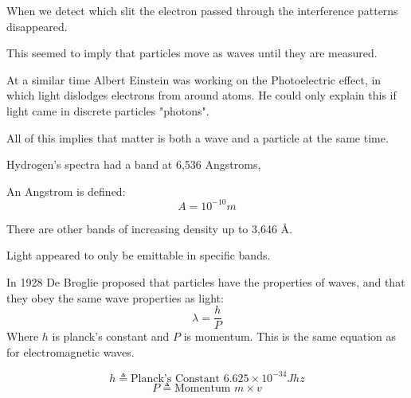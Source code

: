 \documentclass{report}
\begin{document}
\begin{description}
\begin{mdframed}
            When we detect which slit the electron passed
            through the interference patterns disappeared.

            This seemed to imply that particles move as
            waves until they are measured.
        \end{mdframed}
        \begin{mdframed}
            At a similar time Albert Einstein was working on
            the Photoelectric effect, in which light dislodges
            electrons from around atoms. He could only explain
            this if light came in discrete particles "photons".

            All of this implies that matter is both a wave
            and a particle at the same time.
        \end{mdframed}
        \begin{mdframed}
           Hydrogen's spectra had a band at 6,536 Angstroms,
           \begin{mdframed}
               An Angstrom is defined:
               \begin{displaymath}
                   A = 10^{-10} \si{m}
               \end{displaymath}
           \end{mdframed}

           There are other bands of increasing density up to
           3,646 \AA.

           Light appeared to only be emittable in specific
           bands.
        \end{mdframed}
        \pagebreak
        \begin{mdframed}
           In 1928 De Broglie proposed that particles have
           the properties of waves, and that they obey
           the same wave properties as light:
           \begin{displaymath}
                \lambda = \frac{h}{P}
           \end{displaymath}
           Where $h$ is planck's constant and  $P$ is momentum.
           This is the same equation as for electromagnetic
           waves.

           \begin{displaymath}
               h \triangleq \text{Planck's Constant } 6.625 \times 10^{-34} \si{Jhz}
           \end{displaymath}
           \begin{displaymath}
               P \triangleq \text{Momentum } m \times v 
           \end{displaymath}


\end{mdframed}
\end{description}
\end{document}
